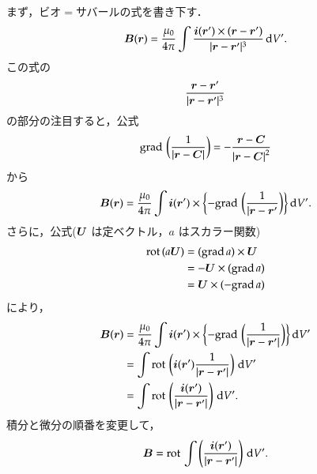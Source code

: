         まず，ビオ$=$サバールの式を書き下す．
            \begin{align}
                \boldsymbol{B}(\boldsymbol{r})
                =\frac{\mu_{0}}{4\pi}
                \int\frac{\boldsymbol{i}(\boldsymbol{r}')\times
                (\boldsymbol{r}-\boldsymbol{r}')
                }{|\boldsymbol{r}-\boldsymbol{r}'|^{3}}\,\mathrm{d} V'.
            \end{align}
        この式の
            \begin{equation*}
                \frac{\boldsymbol{r}-\boldsymbol{r}'}{|\boldsymbol{r}-\boldsymbol{r}'|^{3}}
            \end{equation*}
        の部分の注目すると，公式
            \begin{equation*}
                \mathrm{grad}\, \left( \frac{1}{|\boldsymbol{r} - \boldsymbol{C}|} \right)
                =
                - \frac{\boldsymbol{r} - \boldsymbol{C}}{{|\boldsymbol{r} - \boldsymbol{C}|}^{2}}
            \end{equation*}
        から
            \begin{align}
                \boldsymbol{B}(\boldsymbol{r})
                =\frac{\mu_{0}}{4\pi}
                    \int
                        \boldsymbol{i}(\boldsymbol{r}')\times
                            \biggl\{
                                - \mathrm{grad}\, \left( \frac{1}{|\boldsymbol{r} - \boldsymbol{r}'} \right)
                            \biggr\}
                    \,\mathrm{d} V'.
            \end{align}
        さらに，公式($\boldsymbol{U}$ は定ベクトル，$a$ はスカラー関数)
            \begin{align*}
                \mathrm{rot}\, (a\boldsymbol{U}) &= (\mathrm{grad}\, a) \times \boldsymbol{U}  \\
                             &= -\boldsymbol{U} \times (\mathrm{grad}\, a)  \\
                             &= \boldsymbol{U} \times (- \mathrm{grad}\, a)
            \end{align*}
        により，
            \begin{align*}
                \boldsymbol{B}(\boldsymbol{r})
                &=\frac{\mu_{0}}{4\pi}
                    \int
                        \boldsymbol{i}(\boldsymbol{r}')\times
                            \biggl\{
                                - \mathrm{grad}\, \left( \frac{1}{|\boldsymbol{r} - \boldsymbol{r}'|} \right)
                            \biggr\}
                    \,\mathrm{d} V'
                 \\
                &= \int
                        \mathrm{rot}\, \left( \boldsymbol{i}(\boldsymbol{r}') \frac{1}{|\boldsymbol{r} - \boldsymbol{r}'|} \right)
                    \,\mathrm{d} V'
                 \\
                &= \int
                        \mathrm{rot}\, \left(\frac{ \boldsymbol{i}(\boldsymbol{r}') }{|\boldsymbol{r} - \boldsymbol{r}'|} \right)
                    \,\mathrm{d} V'.
            \end{align*}
        積分と微分の順番を変更して，
            \begin{align}
                \boldsymbol{B} = \mathrm{rot}\, \int \left(\frac{ \boldsymbol{i}(\boldsymbol{r}') }{|\boldsymbol{r} - \boldsymbol{r}'|} \right) \,\mathrm{d} V'.
            \end{align}

